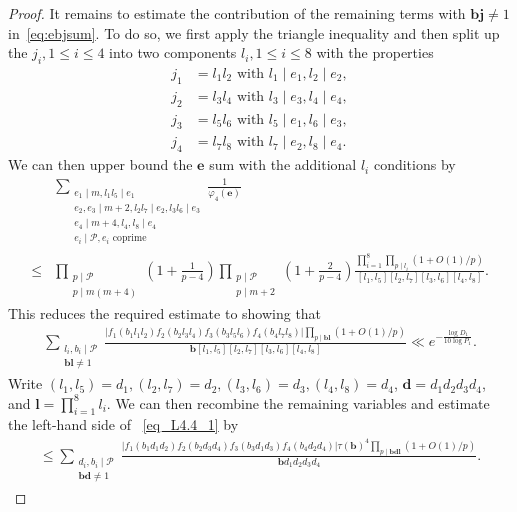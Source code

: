 \documentclass[12pt]{amsart}
\theoremstyle{definition}
\theoremstyle{remark}
\numberwithin{equation}{section}
\newcommand{\1}{\mathbf{1}}
\begin{document}
\begin{proof}
    It remains to estimate the contribution of the remaining terms with  $\mathbf{b}\mathbf{j}\neq 1$ in~\eqref{eq:ebjsum}. To do so, we first apply the triangle inequality and then split up the $j_i, 1\leq i \leq 4$ into two components $l_i, 1\leq i \leq 8$ with the properties 
    \begin{align*}
        j_1&=l_1l_2 \text{ with } l_1\mid e_1, l_2\mid e_2,\\
        j_2&=l_3l_4 \text{ with } l_3\mid e_3, l_4\mid e_4,\\
        j_3&=l_5l_6 \text{ with } l_5\mid e_1, l_6\mid e_3,\\
        j_4&=l_7l_8 \text{ with } l_7\mid e_2, l_8\mid e_4.
    \end{align*}
    We can then upper bound the $\mathbf{e}$ sum with the additional $l_i$ conditions by
	\begin{align*}
		&\sum_{\substack{e_1\mid m, l_1l_5\mid e_1 \\ e_2, e_3\mid  m+2, l_2l_7\mid e_2, l_3l_6\mid e_3\\ e_4\mid m+4, l_4,l_8\mid e_4 \\ e_i\mid \mathcal{P}, e_i \text{ coprime}}}\frac{1}{\varphi_4(\mathbf{e})} \\
		\leq& \prod_{\substack{p\mid \mathcal{P}\\ p\mid m(m+4)}}\left(1+\frac{1}{p-4}\right)\prod_{\substack{p\mid \mathcal{P}\\ p\mid m+2}}\left(1+\frac{2}{p-4}\right) \frac{\prod_{i=1}^8\prod_{p\mid l_i}\left(1+O(1)/p\right)}{[l_1,l_5][l_2,l_7][l_3,l_6][l_4,l_8]}.
	\end{align*}
    This reduces the required estimate to showing that 
	\begin{align}\label{eq_L4.4_1}
	   \sum_{\substack{l_i, b_i\mid \mathcal{P}\\ \mathbf{bl}\neq 1}}\frac{\left|f_1(b_1l_1l_2)f_2(b_2l_3l_4)f_3(b_3l_5l_6)f_4(b_4l_7l_8)\right|\prod_{p\mid \mathbf{b}\mathbf{l}}\left(1+O(1)/p\right)}{\mathbf{b} [l_1,l_5][l_2,l_7][l_3,l_6][l_4,l_8]}\ll e^{-\frac{\log D_1}{10 \log P_1}}.
	\end{align}
	Write $(l_1,l_5)=d_1, (l_2,l_7)=d_2, (l_3,l_6)=d_3, (l_4,l_8)=d_4$, $\mathbf{d}=d_1d_2d_3d_4$, and $\mathbf{l}=\prod_{i=1}^8l_i$. We can then recombine the remaining variables and estimate the left-hand side of ~\eqref{eq_L4.4_1} by
	\begin{align*}
		\leq \sum_{\substack{d_i, b_i\mid \mathcal{P}\\ \mathbf{bd}\neq 1}} \frac{\left|f_1(b_1d_1 d_2)f_2(b_2d_3d_4)f_3(b_3d_1d_3)f_4(b_4d_2d_4)\right|\tau(\mathbf{b})^4\prod_{p\mid \mathbf{bd}\mathbf{l}}\left(1+O(1)/p\right)}{\mathbf{b} d_1d_2d_3d_4}.

\end{align*}
\end{proof}
\end{document}
